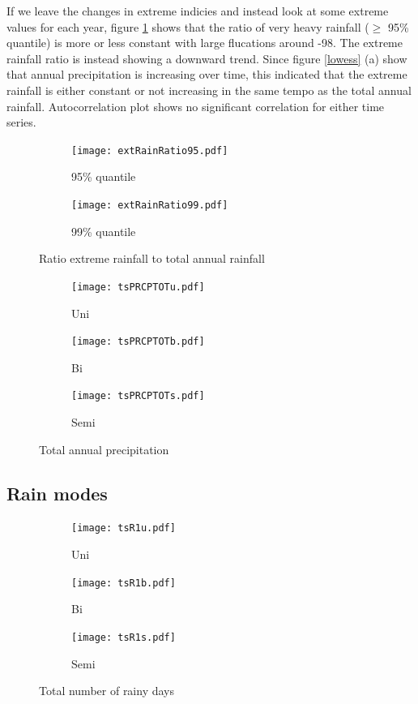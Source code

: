 \documentclass{article}
\begin{document}
If we leave the changes in extreme indicies and instead look at some extreme values for each year, figure \ref{extRainRatio} shows that the ratio of very heavy rainfall ($\geq$ 95\% quantile) is more or less constant with large flucations around -98. The extreme rainfall ratio is instead showing a downward trend. Since figure \ref{lowess} (a) show that annual precipitation is increasing over time, this indicated that the extreme rainfall is either constant or not increasing in the same tempo as the total annual rainfall. Autocorrelation plot shows no significant correlation for either time series. 
\begin{figure}[H]
	\centering
	\begin{subfigure}{0.5\textwidth}
		\centering
		\texttt{[image: extRainRatio95.pdf]}
		\caption{95\% quantile}
	\end{subfigure}%
	\begin{subfigure}{0.5\textwidth}
		\centering
		\texttt{[image: extRainRatio99.pdf]}
		\caption{99\% quantile}
	\end{subfigure}	
	\caption{Ratio extreme rainfall to total annual rainfall}
	\label{extRainRatio}
\end{figure}

\begin{figure}[H]
	\centering
	\begin{subfigure}{0.3\textwidth}
		\centering
		\texttt{[image: tsPRCPTOTu.pdf]}
		\caption{Uni}
	\end{subfigure}%
	\begin{subfigure}{0.3\textwidth}
		\centering
		\texttt{[image: tsPRCPTOTb.pdf]}
		\caption{Bi}
	\end{subfigure}%
	\begin{subfigure}{0.3\textwidth}
		\centering
		\texttt{[image: tsPRCPTOTs.pdf]}
		\caption{Semi}
	\end{subfigure}
	\caption{Total annual precipitation}
	\label{modesPRCPTOT}
\end{figure}

\subsection{Rain modes}
\begin{figure}[H]
	\centering
	\begin{subfigure}{0.3\textwidth}
		\centering
		\texttt{[image: tsR1u.pdf]}
		\caption{Uni}
	\end{subfigure}%
	\begin{subfigure}{0.3\textwidth}
		\centering
		\texttt{[image: tsR1b.pdf]}
		\caption{Bi}
	\end{subfigure}%
	\begin{subfigure}{0.3\textwidth}
		\centering
		\texttt{[image: tsR1s.pdf]}
		\caption{Semi}
	\end{subfigure}
	\caption{Total number of rainy days}
	\label{modesR1}
\end{figure}
\end{document}
